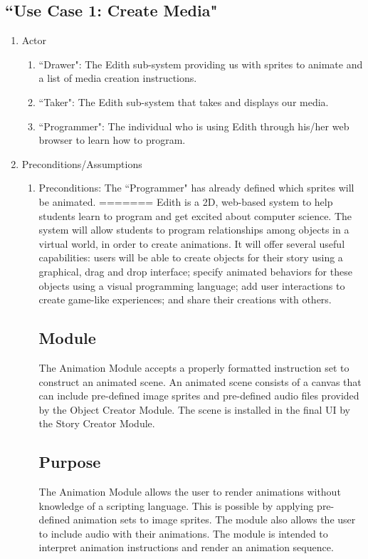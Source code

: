 \documentclass[12pt]{article}
\begin{document}
	\subsection{``Use Case 1: Create Media"}
\begin{enumerate}
  \item Actor
  \begin{enumerate}
  		\item ``Drawer": The Edith sub-system providing us with sprites to animate and a list of media creation instructions.
   		 \item ``Taker": The Edith sub-system that takes and displays our media.
       \item ``Programmer": The individual who is using Edith through his/her web browser to learn how to program.
  \end{enumerate}
  \item Preconditions/Assumptions
  \begin{enumerate}
   		 \item Preconditions: The ``Programmer" has already defined which sprites will be animated.
=======
         Edith is a 2D, web-based system to help students learn to program and get excited about computer science. The system will allow students to program relationships among objects in a virtual world, in order to create animations. It will offer several useful capabilities: users will be able to create objects for their story using a graphical, drag and drop interface; specify animated behaviors for these objects using a visual programming language; add user interactions to create game-like experiences; and share their creations with others. 
	\subsection{Module}
	The Animation Module accepts a properly formatted instruction set to construct an animated scene. An animated scene consists of a canvas that can include pre-defined image sprites and pre-defined audio files provided by the Object Creator Module. The scene is installed in the final UI by the Story Creator Module. 
	\subsection{Purpose}
        The Animation Module allows the user to render animations without knowledge of a scripting language. This is possible by applying pre-defined animation sets to image sprites. The module also allows the user to include audio with their animations. The module is intended to interpret animation instructions and render an animation sequence.



\end{enumerate}
\end{enumerate}
\end{document}
